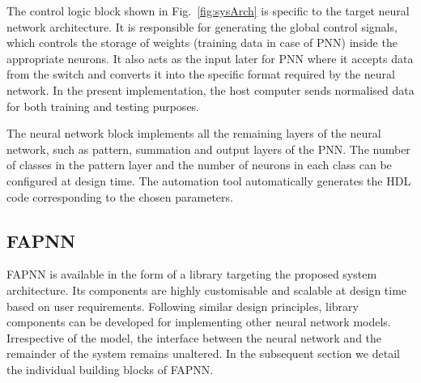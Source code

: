 The control logic block shown in Fig.~\ref{fig:sysArch} is specific to the target neural network architecture.
It is responsible for generating the global control signals, which controls the storage of weights (training data in case of PNN) inside the appropriate neurons.
It also acts as the input later for PNN where it accepts data from the switch and converts it into the specific format required by the neural network.
In the present implementation, the host computer sends normalised data for both training and testing purposes.

The neural network block implements all the remaining layers of the neural network, such as pattern, summation and output layers of the PNN.
The number of classes in the pattern layer and the number of neurons in each class can be configured at design time.
The automation tool automatically generates the HDL code corresponding to the chosen parameters.

\subsection{FAPNN}
FAPNN is available in the form of a library targeting the proposed system architecture.
Its components are highly customisable and scalable at design time based on user requirements.
Following similar design principles, library components can be developed for implementing other neural network models.
Irrespective of the model, the interface between the neural network and the remainder of the system remains unaltered.
In the subsequent section we detail the individual building blocks of FAPNN.

